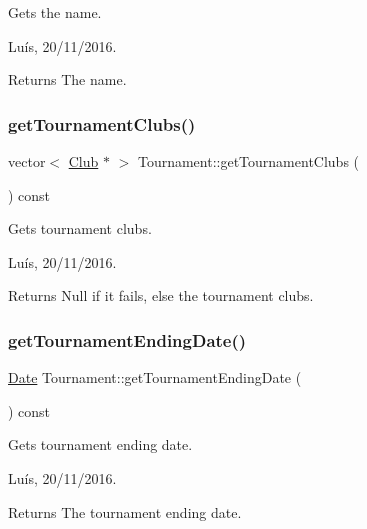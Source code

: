 Gets the name. 

Luís, 20/11/2016. 

\begin{DoxyReturn}{Returns}
The name. 
\end{DoxyReturn}
\hypertarget{class_tournament_a51a2a85ded44857ab3798c8a9855f5b6}{}\label{class_tournament_a51a2a85ded44857ab3798c8a9855f5b6} 
\subsubsection{\texorpdfstring{get\+Tournament\+Clubs()}{getTournamentClubs()}}
{\footnotesize\ttfamily vector$<$ \hyperlink{class_club}{Club} $\ast$ $>$ Tournament\+::get\+Tournament\+Clubs (\begin{DoxyParamCaption}{ }\end{DoxyParamCaption}) const}



Gets tournament clubs. 

Luís, 20/11/2016. 

\begin{DoxyReturn}{Returns}
Null if it fails, else the tournament clubs. 
\end{DoxyReturn}
\hypertarget{class_tournament_adffedf926ee07ba1a18424f71070ad3e}{}\label{class_tournament_adffedf926ee07ba1a18424f71070ad3e} 
\subsubsection{\texorpdfstring{get\+Tournament\+Ending\+Date()}{getTournamentEndingDate()}}
{\footnotesize\ttfamily \hyperlink{class_date}{Date} Tournament\+::get\+Tournament\+Ending\+Date (\begin{DoxyParamCaption}{ }\end{DoxyParamCaption}) const}



Gets tournament ending date. 

Luís, 20/11/2016. 

\begin{DoxyReturn}{Returns}
The tournament ending date. 
\end{DoxyReturn}
\hypertarget{class_tournament_af7b21e0eff39c9ebcba96f1a319d7f67}{}\label{class_tournament_af7b21e0eff39c9ebcba96f1a319d7f67} 
